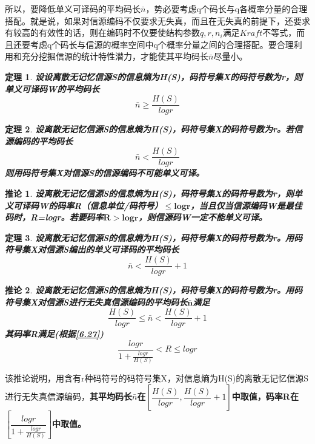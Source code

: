 \documentclass[UTF8]{ctexart}
\theoremstyle{plain}
\newtheorem{theorem}{定理}[section]
\newtheorem{corollary}{推论}[section]
\theoremstyle{definition}
\theoremstyle{remark}
\begin{document}
所以，要降低单义可译码的平均码长$\bar{n}$，势必要考虑q个码长与q各概率分量的合理搭配。就是说，如果对信源编码不仅要求无失真，而且在无失真的前提下，还要求有较高的有效性的话，则在编码时不仅要使结构参数$q,r,n_i$满足$Kraft$不等式，而且还要考虑q个码长与信源的概率空间中q个概率分量之间的合理搭配。要合理利用和充分挖掘信源的统计特性潜力，才能使其平均码长$\bar{n}$尽量小。
\begin{theorem}
	\label{th6.2}
	\textbf{设设离散无记忆信源S的信息熵为H(S)，码符号集X的码符号数为r，则单义可译码W的平均码长}
	\begin{equation}
	\label{6.29}
	\bar{n}\geqslant\dfrac{H(S)}{logr}
	\end{equation}
\end{theorem}
\begin{theorem}
	\label{th6.3}
	\textbf{设离散无记忆信源S的信息熵为H(S)，码符号集X的码符号数为r。若信源编码的平均码长}
	\begin{equation*}
	\bar{n}<\dfrac{H(S)}{logr}
	\end{equation*}
	\textbf{则用码符号集X对信源S的信源编码不可能单义可译。}
\end{theorem}

\begin{corollary}
	\label{co1}
	\textbf{设离散无记忆信源S的信息熵为H(S)，码符号集X的码符号数为r，则单义可译码W的码率R（信息单位/码符号）$\bm{\leqslant logr}$，当且仅当信源编码W是最佳码时，R=logr。若要码率$\bm{R>logr}$，则信源码W一定不能单义可译。}
\end{corollary}

\begin{theorem}
	\label{th6.4}
	\textbf{设离散无记忆信源S的信息熵为H(S)，码符号集X的码符号数为r。用码符号集X对信源S编出的单义可译码的平均码长}
	\begin{equation}
	\label{6.53}
	\bar{n}<\dfrac{H(S)}{logr}+1
	\end{equation}
\end{theorem}

\begin{corollary}
	\label{co2}
	\textbf{设离散无记忆信源S的信息熵为H(S)，码符号集X的码符号数为r。用码符号集X对信源S进行无失真信源编码的平均码长$\bm{\bar{n}}$满足}
	\begin{equation}
	\label{6.63}
	\dfrac{H(S)}{logr}\leqslant \bar{n} < \dfrac{H(S)}{logr}+1
	\end{equation}
	\textbf{其码率R满足(根据\cref{6.27})}
	\begin{equation}
	\label{6.64}
	\dfrac{logr}{1+\frac{logr}{H(S)}}<R\leqslant logr
	\end{equation}
\end{corollary}
该推论说明，用含有r种码符号的码符号集X，对信息熵为H(S)的离散无记忆信源S进行无失真信源编码，\textbf{\textcolor[rgb]{1,0,0}{其平均码长$\bar{n}$在$\left[\dfrac{H(S)}{logr},\dfrac{H(S)}{logr}+1\right]$中取值，码率R在$\left[\dfrac{logr}{1+\frac{logr}{H(S)}}\right]$中取值。}}
\end{document}
